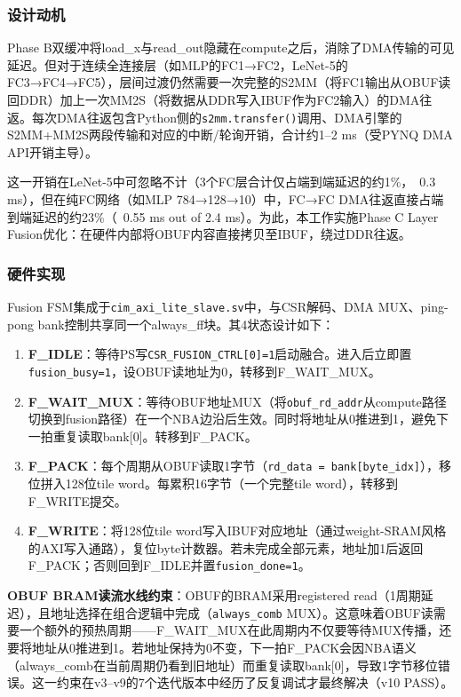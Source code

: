 \documentclass[12pt, a4paper]{article}
\begin{document}
\subsubsection{设计动机}

Phase B双缓冲将load\_x与read\_out隐藏在compute之后，消除了DMA传输的可见延迟。但对于连续全连接层（如MLP的FC1→FC2，LeNet-5的FC3→FC4→FC5），层间过渡仍然需要一次完整的S2MM（将FC1输出从OBUF读回DDR）加上一次MM2S（将数据从DDR写入IBUF作为FC2输入）的DMA往返。每次DMA往返包含Python侧的\texttt{s2mm.transfer()}调用、DMA引擎的S2MM+MM2S两段传输和对应的中断/轮询开销，合计约1--2 ms（受PYNQ DMA API开销主导）。

这一开销在LeNet-5中可忽略不计（3个FC层合计仅占端到端延迟的约1\%，~0.3 ms），但在纯FC网络（如MLP 784→128→10）中，FC→FC DMA往返直接占端到端延迟的约23\%（~0.55 ms out of 2.4 ms）。为此，本工作实施Phase C Layer Fusion优化：在硬件内部将OBUF内容直接拷贝至IBUF，绕过DDR往返。

\subsubsection{硬件实现}

Fusion FSM集成于\texttt{cim\_axi\_lite\_slave.sv}中，与CSR解码、DMA MUX、ping-pong bank控制共享同一个always\_ff块。其4状态设计如下：

\begin{enumerate}
    \item \textbf{F\_IDLE}：等待PS写\texttt{CSR\_FUSION\_CTRL[0]=1}启动融合。进入后立即置\texttt{fusion\_busy=1}，设OBUF读地址为0，转移到F\_WAIT\_MUX。
    \item \textbf{F\_WAIT\_MUX}：等待OBUF地址MUX（将\texttt{obuf\_rd\_addr}从compute路径切换到fusion路径）在一个NBA边沿后生效。同时将地址从0推进到1，避免下一拍重复读取bank[0]。转移到F\_PACK。
    \item \textbf{F\_PACK}：每个周期从OBUF读取1字节（\texttt{rd\_data = bank[byte\_idx]}），移位拼入128位tile word。每累积16字节（一个完整tile word），转移到F\_WRITE提交。
    \item \textbf{F\_WRITE}：将128位tile word写入IBUF对应地址（通过weight-SRAM风格的AXI写入通路），复位byte计数器。若未完成全部元素，地址加1后返回F\_PACK；否则回到F\_IDLE并置\texttt{fusion\_done=1}。
\end{enumerate}

\textbf{OBUF BRAM读流水线约束}：OBUF的BRAM采用registered read（1周期延迟），且地址选择在组合逻辑中完成（\texttt{always\_comb} MUX）。这意味着OBUF读需要一个额外的预热周期——F\_WAIT\_MUX在此周期内不仅要等待MUX传播，还要将地址从0推进到1。若地址保持为0不变，下一拍F\_PACK会因NBA语义（always\_comb在当前周期仍看到旧地址）而重复读取bank[0]，导致1字节移位错误。这一约束在v3--v9的7个迭代版本中经历了反复调试才最终解决（v10 PASS）。
\end{document}
